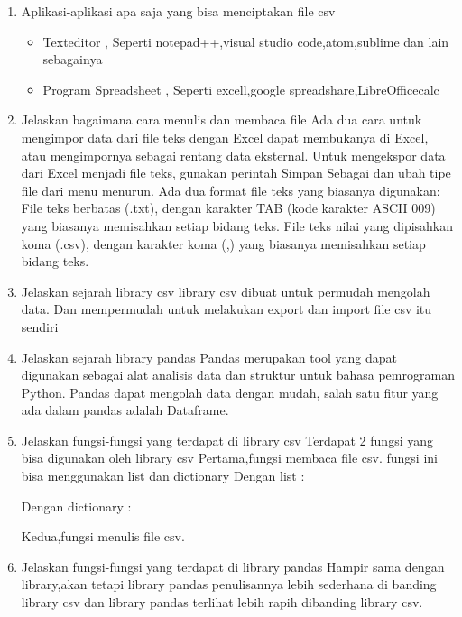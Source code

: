 \begin{enumerate}
\item Aplikasi-aplikasi apa saja yang bisa menciptakan file csv
\begin{itemize}
\item Texteditor , Seperti notepad++,visual studio code,atom,sublime dan lain sebagainya
\item Program Spreadsheet , Seperti excell,google spreadshare,LibreOfficecalc
\end{itemize}
\item Jelaskan bagaimana cara menulis dan membaca file 
 Ada dua cara untuk mengimpor data dari file teks dengan Excel dapat membukanya di Excel, atau mengimpornya sebagai rentang data eksternal. Untuk mengekspor data dari Excel menjadi file teks, gunakan perintah Simpan Sebagai dan ubah tipe file dari menu menurun.
Ada dua format file teks yang biasanya digunakan:
File teks berbatas (.txt), dengan karakter TAB (kode karakter ASCII 009) yang biasanya memisahkan setiap bidang teks. 
File teks nilai yang dipisahkan koma (.csv), dengan karakter koma (,) yang biasanya memisahkan setiap bidang teks.
\item Jelaskan sejarah library csv
library csv dibuat untuk permudah mengolah data. Dan mempermudah untuk melakukan export dan import file csv itu sendiri
\item Jelaskan sejarah library pandas
Pandas merupakan tool yang dapat digunakan sebagai alat analisis data dan struktur untuk bahasa pemrograman Python. Pandas dapat mengolah data dengan mudah, salah satu fitur yang ada dalam pandas adalah Dataframe. 
\item Jelaskan fungsi-fungsi yang terdapat di library csv
Terdapat 2 fungsi yang bisa digunakan oleh library csv
Pertama,fungsi membaca file csv.
fungsi ini bisa menggunakan list dan dictionary
Dengan list :

Dengan dictionary :

Kedua,fungsi menulis file csv.

\item Jelaskan fungsi-fungsi yang terdapat di library pandas
Hampir sama dengan library,akan tetapi library pandas penulisannya lebih sederhana di banding library csv dan library pandas terlihat lebih rapih dibanding library csv.

\end{enumerate}


